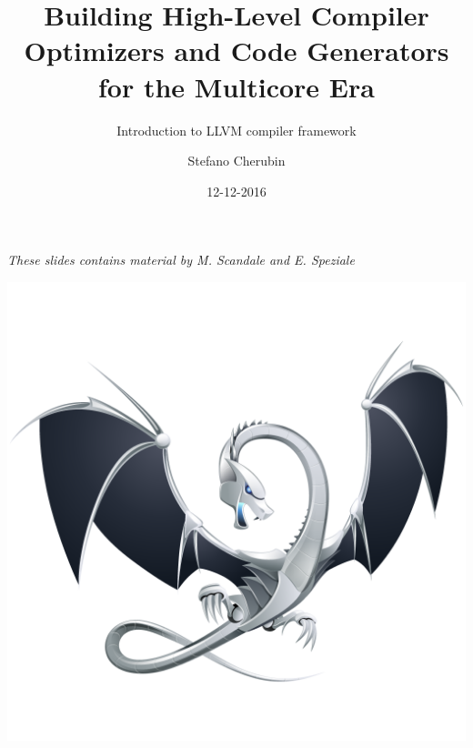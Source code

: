 \documentclass[10pt,mathserif]{beamer}
\author{Stefano Cherubin}
\institute{Politecnico di Milano}
\date{12-12-2016}
\title[12-12-2016 Seminar]{Building High-Level Compiler Optimizers and Code Generators for the Multicore Era}
\subtitle{Introduction to LLVM compiler framework}
\begin{document}
\begin{frame}
\maketitle
\begin{center}
\itshape\scriptsize These slides contains material by M. Scandale and E. Speziale
\end{center}
\end{frame}


\begin{frame}[plain]{}
  \begin{center}
    \vspace{-.1\textheight}
    \includegraphics[width=\textwidth]{img/00/logo.png}
  \end{center}
\end{frame}
\end{document}
